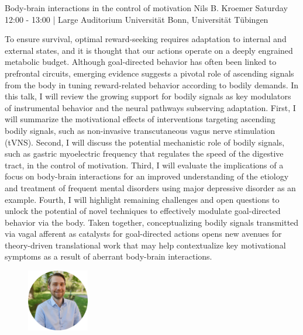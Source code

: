
\begin{keynote}
    {Body-brain interactions in the control of motivation}
    {Nils B. Kroemer}
    {Saturday 12:00 - 13:00 | Large Auditorium}
    {Universität Bonn, Universität Tübingen}

    To ensure survival, optimal reward-seeking requires adaptation to internal and external states, and it is thought that our actions operate on a deeply engrained metabolic budget. Although goal-directed behavior has often been linked to prefrontal circuits, emerging evidence suggests a pivotal role of ascending signals from the body in tuning reward-related behavior according to bodily demands. In this talk, I will review the growing support for bodily signals as key modulators of instrumental behavior and the neural pathways subserving adaptation. First, I will summarize the motivational effects of interventions targeting ascending bodily signals, such as non-invasive transcutaneous vagus nerve stimulation (tVNS). Second, I will discuss the potential mechanistic role of bodily signals, such as gastric myoelectric frequency that regulates the speed of the digestive tract, in the control of motivation. Third, I will evaluate the implications of a focus on body-brain interactions for an improved understanding of the etiology and treatment of frequent mental disorders using major depressive disorder as an example. Fourth, I will highlight remaining challenges and open questions to unlock the potential of novel techniques to effectively modulate goal-directed behavior via the body. Taken together, conceptualizing bodily signals transmitted via vagal afferent as catalysts for goal-directed actions opens new avenues for theory-driven translational work that may help contextualize key motivational symptoms as a result of aberrant body-brain interactions.

    \vspace*{0.5cm}

    \begin{figure}[H]
        \raggedleft
        \includegraphics[width=0.24\textwidth]{tex/images/keynote_speaker/kroemer_cropped.png}
    \end{figure}

\end{keynote}
